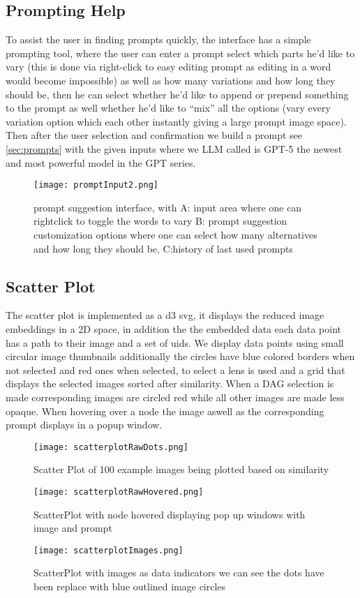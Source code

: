\documentclass[
  a4paper,  %
  twoside,  %
  bibliography=totoc,
  headsepline,
  cleardoublepage=empty,
  parskip=half,
  draft=false
]{scrbook}
\begin{document}
\subsection{Prompting Help}
To assist the user in finding prompts quickly, the interface has a simple prompting tool, where the user can enter a prompt select which parts he'd like to vary (this is done via right-click to easy editing prompt as editing in a word would become impossible) as well as how many variations and how long they should be, then he can select whether he'd like to append or prepend something to the prompt as well whether he'd like to \enquote{mix} all the options (vary every variation option which each other instantly giving a large prompt image space). Then after the user selection and confirmation we build a prompt see \autoref{sec:prompts} with the given inputs where we  LLM called is GPT-5 the newest and most powerful model in the GPT series.
\begin{figure}[H]
	\centering
	\texttt{[image: promptInput2.png]}
	\caption{prompt suggestion interface, with A: input area where one can rightclick to toggle the words to vary B: prompt suggestion customization options where one can select how many alternatives and how long they should be, C:history of last used prompts}
	\label{fig:promptInput}
\end{figure}



\subsection{Scatter Plot}
The scatter plot is implemented as a d3 svg, it displays the reduced image embeddings in a 2D space, in addition the the embedded data each data point has a path to their image and a set of uids. We display data points using small circular image thumbnails additionally the circles have blue colored borders when not selected and red ones when selected, to select a lens is used and a grid that displays the selected images sorted after similarity. When a DAG selection is made corresponding images are circled red while all other images are made less opaque. When hovering over a node the image aswell as the corresponding prompt displays in a popup window. 
\begin{figure}[H]
	\centering
	\texttt{[image: scatterplotRawDots.png]}
	\caption{Scatter Plot of 100 example images being plotted based on similarity }
	\label{fig:scatterDots}
\end{figure}
\begin{figure}[H]
	\centering
	\texttt{[image: scatterplotRawHovered.png]}
	\caption{ScatterPlot with node hovered displaying pop up windows with image and prompt}
	\label{fig:scatterHovered}
\end{figure}
\begin{figure}[H]
	\centering
	\texttt{[image: scatterplotImages.png]}
	\caption{ScatterPlot with images as data indicators we can see the dots have been replace with blue outlined image circles  }
	\label{fig:scatterImages}
\end{figure}
\end{document}
